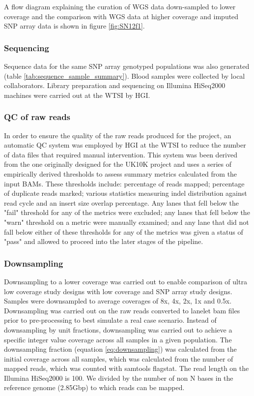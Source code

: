 A flow diagram explaining the curation of \gls{WGS} data down-sampled to lower coverage and the comparison with \gls{WGS} data at higher coverage and imputed SNP array data is shown in figure \ref{fig:SN12f1}.


\subsubsection{Sequencing}
\label{subsec:sequence}
Sequence data for the same SNP array genotyped populations was also generated (table \ref{tab:sequence_sample_summary}). Blood samples were collected by local collaborators. Library preparation and sequencing on Illumina HiSeq2000 machines were carried out at the \gls{WTSI} by \gls{HGI}.



\subsubsection{QC of raw reads}
In order to ensure the quality of the raw reads produced for the project, an automatic \gls{QC} system was employed by \gls{HGI} at the \gls{WTSI} to reduce the number of data files that required manual intervention. This system was been derived from the one originally designed for the UK10K project and uses a series of empirically derived thresholds to assess summary metrics calculated from the input \glspl{BAM}. These thresholds include: percentage of reads mapped; percentage of duplicate reads marked; various statistics measuring indel distribution against read cycle and an insert size overlap percentage. Any lanes that fell below the "fail" threshold for any of the metrics were excluded; any lanes that fell below the "warn" threshold on a metric were manually examined; and any lane that did not fall below either of these thresholds for any of the metrics was given a status of "pass" and allowed to proceed into the later stages of the pipeline.

\subsubsection{Downsampling}
Downsampling to a lower coverage was carried out to enable comparison of ultra low coverage study designs with low coverage and SNP array study designs. Samples were downsampled to average coverages of 8x, 4x, 2x, 1x and 0.5x. Downsampling was carried out on the raw reads converted to lanelet bam files prior to pre-processing to best simulate a real case scenario. Instead of downsampling by unit fractions\cite{10.1371/journal.pcbi.1002604}, downsampling was carried out to achieve a specific integer value coverage across all samples in a given population. The downsampling fraction (equation \ref{eq:downsampling}) was calculated from the initial coverage across all samples, which was calculated from the number of mapped reads, which was counted with samtools\cite{Li15082009} flagstat. The read length on the Illumina HiSeq2000 is 100. We divided by the number of non N bases in the reference genome (2.85\gls{Gbp}) to which reads can be mapped.

